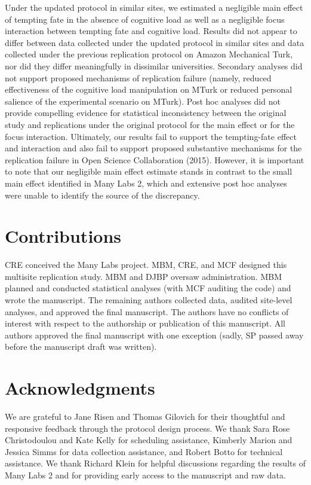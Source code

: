 \documentclass[english,floatsintext,man]{apa6}
\newcounter{author}
\theoremstyle{definition}
\theoremstyle{definition}
\theoremstyle{definition}
\theoremstyle{remark}
\begin{document}
Under the updated protocol in similar sites, we estimated a negligible
main effect of tempting fate in the absence of cognitive load as well as
a negligible focus interaction between tempting fate and cognitive load.
Results did not appear to differ between data collected under the
updated protocol in similar sites and data collected under the previous
replication protocol on Amazon Mechanical Turk, nor did they differ
meaningfully in dissimilar universities. Secondary analyses did not
support proposed mechanisms of replication failure (namely, reduced
effectiveness of the cognitive load manipulation on MTurk or reduced
personal salience of the experimental scenario on MTurk). Post hoc
analyses did not provide compelling evidence for statistical
inconsistency between the original study and replications under the
original protocol for the main effect or for the focus interaction.
Ultimately, our results fail to support the tempting-fate effect and
interaction and also fail to support proposed substantive mechanisms for
the replication failure in Open Science Collaboration (2015). However,
it is important to note that our negligible main effect estimate stands
in contrast to the small main effect identified in Many Labs 2, which
and extensive post hoc analyses were unable to identify the source of
the discrepancy.

\section{Contributions}\label{contributions}

CRE conceived the Many Labs project. MBM, CRE, and MCF designed this
multisite replication study. MBM and DJBP oversaw administration. MBM
planned and conducted statistical analyses (with MCF auditing the code)
and wrote the manuscript. The remaining authors collected data, audited
site-level analyses, and approved the final manuscript. The authors have
no conflicts of interest with respect to the authorship or publication
of this manuscript. All authors approved the final manuscript with one
exception (sadly, SP passed away before the manuscript draft was
written).

\section{Acknowledgments}\label{acknowledgments}

We are grateful to Jane Risen and Thomas Gilovich for their thoughtful
and responsive feedback through the protocol design process. We thank
Sara Rose Christodoulou and Kate Kelly for scheduling assistance,
Kimberly Marion and Jessica Simms for data collection assistance, and
Robert Botto for technical assistance. We thank Richard Klein for
helpful discussions regarding the results of Many Labs 2 and for
providing early access to the manuscript and raw data.
\end{document}
